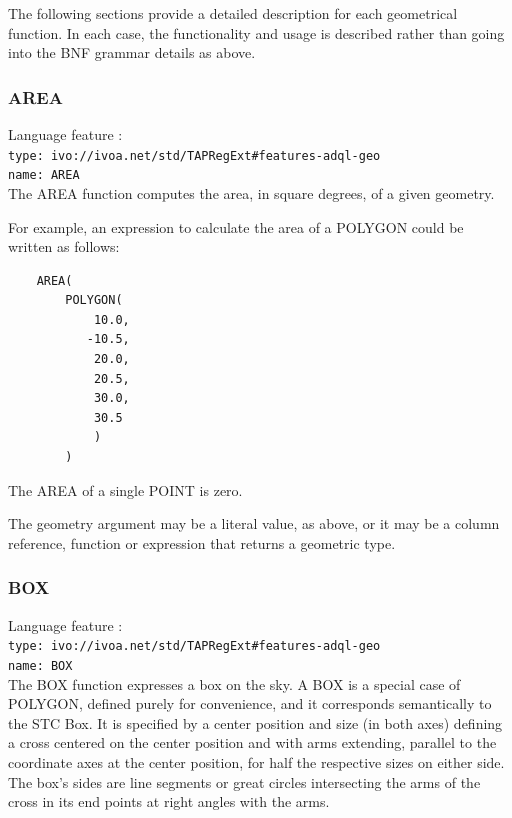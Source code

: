 \documentclass[11pt,a4paper]{ivoa}
\begin{document}
\clearpage
\label{sec:functions.geom.definitions}

The following sections provide a detailed description for each geometrical
function. In each case, the functionality and usage is described rather
than going into the BNF grammar details as above.

\subsubsection{AREA}
\label{sec:functions.geom.area}
{\footnotesize Language feature :}\\
{\footnotesize \verb|type: ivo://ivoa.net/std/TAPRegExt#features-adql-geo|}\\
{\footnotesize \verb|name: AREA|}\\

The AREA function computes the area, in square degrees, of a given geometry.

For example, an expression to calculate the area of a POLYGON could be
written as follows:
\begin{verbatim}
    AREA(
        POLYGON(
            10.0,
           -10.5,
            20.0,
            20.5,
            30.0,
            30.5
            )
        )
\end{verbatim}

The AREA of a single POINT is zero.

The geometry argument may be a literal value, as above, or it may be a
column reference, function or expression that returns a geometric type.

\subsubsection{BOX}
\label{sec:functions.geom.box}
{\footnotesize Language feature :}\\
{\footnotesize \verb|type: ivo://ivoa.net/std/TAPRegExt#features-adql-geo|}\\
{\footnotesize \verb|name: BOX|}\\

The BOX function expresses a box on the sky. A BOX is a special case of POLYGON,
defined purely for convenience, and it corresponds semantically to the STC Box.
It is specified by a center position and size
(in both axes) defining a cross centered on the center position and
with arms extending, parallel to the coordinate axes at the center position,
for half the respective sizes on either side. The box’s sides are line
segments or great circles intersecting the arms of the cross in its end
points at right angles with the arms.
\end{document}
